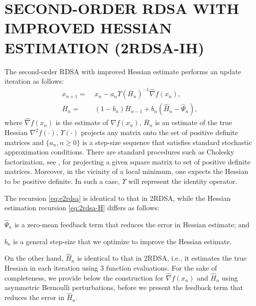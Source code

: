 \documentclass[twocolumn]{IEEEtran}
\begin{document}
\section{SECOND-ORDER RDSA WITH IMPROVED HESSIAN ESTIMATION (2RDSA-IH)}
\label{sec:2rdsa-ih}
The second-order RDSA with improved Hessian estimate performs an update iteration as follows:
\begin{align}
\label{eq:e2rdsa}
x_{n+1} = & \; x_n - a_n \Upsilon(\overline H_n)^{-1}\widehat\nabla f(x_n), \\
\overline H_n = & \; (1-b_{n})  \overline H_{n-1} + b_{n} ( \widehat H_n - \widehat \Psi_n),\label{eq:2rdsa-H}
\end{align}
where $\widehat\nabla f(x_n)$ is the estimate of $\nabla f(x_n)$, 
$\overline H_n$ is an estimate of the true Hessian ${\nabla}^2 f(\cdot)$, $\Upsilon(\cdot)$ projects any matrix onto the set of positive definite matrices and $\{a_n, n\ge 0\}$ is a step-size sequence that satisfies standard stochastic approximation conditions. There are standard procedures such as Cholesky factorization, see \cite{bert22}, for projecting a given square matrix to set of positive definite matrices. Moreover, in the vicinity of a local minimum, one expects the Hessian to be positive definite. In such a case, $\Upsilon$ will represent the identity operator.

The recursion \eqref{eq:e2rdsa} is identical to that in 2RDSA, while the Hessian estimation recursion \eqref{eq:2rdsa-H} differs as follows:\\
\begin{inparaenum}[\bfseries (i)]
\item  $\widehat \Psi_n$ is a zero-mean feedback term that reduces the error in Hessian estimate; and\\
\item $b_n$ is a general step-size that we optimize to improve the Hessian estimate.
\end{inparaenum}

On the other hand, $\widehat H_n$ is identical to that in 2RDSA, i.e., it estimates the true Hessian in each iteration using $3$ function evaluations. %
For the sake of completeness, we provide below the construction for $\widehat\nabla f(x_n)$ and $\widehat H_n$ using asymmetric Bernoulli perturbations, before we present the feedback term that reduces the error in $\widehat H_n$.
\end{document}
